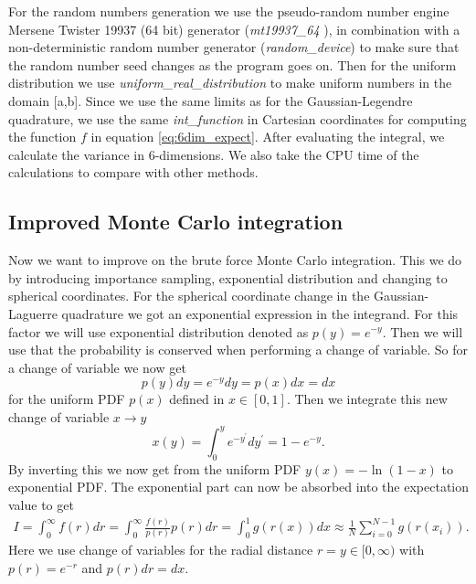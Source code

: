 \documentclass[12pt,a4paper,english]{article}
\begin{document}
For the random numbers generation we use the pseudo-random number engine Mersene Twister 19937 (64 bit) generator (\textit{mt19937\_64
}), in combination with a non-deterministic random number generator (\textit{random\_device}) to make sure that the random number seed changes as the program goes on. Then for the uniform distribution we use \textit{uniform\_real\_distribution} to make uniform numbers in the domain [a,b]. Since we use the same limits as for the Gaussian-Legendre quadrature, we use the same \textit{int\_function} in Cartesian coordinates for computing the function $f$ in equation \ref{eq:6dim_expect}. After evaluating the integral, we calculate the variance in 6-dimensions. We also take the CPU time of the calculations to compare with other methods.

\subsection{Improved Monte Carlo integration}
Now we want to improve on the brute force Monte Carlo integration. This we do by introducing importance sampling, exponential distribution and changing to spherical coordinates. For the spherical coordinate change in the Gaussian-Laguerre quadrature we got an exponential expression in the integrand. For this factor we will use exponential distribution denoted as $p(y)=e^{-y}$. Then we will use that the probability is conserved when performing a change of variable. So for a change of variable we now get
\[p(y)dy=e^{-y}dy=p(x)dx=dx\]
for the uniform PDF $p(x)$ defined in $x\in[0,1]$. Then we integrate this new change of variable $x\rightarrow y$
\[x(y)=\int_{0}^{y}e^{-y^{\prime}}dy^{\prime}=1-e^{-y}.\]
By inverting this we now get from the uniform PDF $y(x)=-\ln(1-x)$ to exponential PDF. The exponential part can now be absorbed into the expectation value to get
\begin{align*}
I=\int_{0}^{\infty}f(r)dr=\int_{0}^{\infty}\frac{f(r)}{p(r)}p(r)dr=\int_{0}^{1}g(r(x))dx\approx \frac{1}{N}\sum_{i=0}^{N-1}g(r(x_i)).
\end{align*}
Here we use change of variables for the radial distance $r=y\in[0,\infty)$ with $p(r)=e^{-r}$ and $p(r)dr=dx$. 
\end{document}
